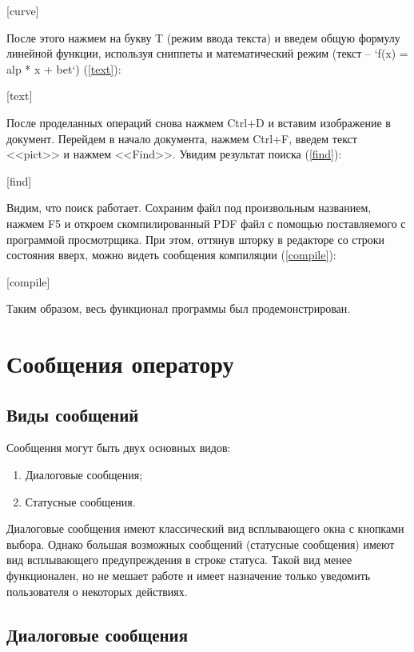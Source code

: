 \documentclass[opermanual]{espd}
\begin{document}
[curve]

После этого нажмем на букву T (режим ввода текста) и введем общую формулу линейной функции, используя сниппеты и математический режим (текст -- `f(x) = alp * x + bet`) (\ref{text}):

[text]

После проделанных операций снова нажмем Ctrl+D и вставим изображение в документ. Перейдем в начало документа, нажмем Ctrl+F, введем текст <<pict>> и нажмем <<Find>>. Увидим результат поиска (\ref{find}):

[find]

Видим, что поиск работает. Сохраним файл под произвольным названием, нажмем F5 и откроем скомпилированный PDF файл с помощью поставляемого с программой просмотрщика. При этом, оттянув шторку в редакторе со строки состояния вверх, можно видеть сообщения компиляции (\ref{compile}):

[compile]

Таким образом, весь функционал программы был продемонстрирован.

\section{Сообщения оператору}
\subsection{Виды сообщений}
Сообщения могут быть двух основных видов:
\begin{enumerate}
\item Диалоговые сообщения;
\item Статусные сообщения.
\end{enumerate}

Диалоговые сообщения имеют классический вид всплывающего окна с кнопками выбора. Однако большая возможных сообщений (статусные сообщения) имеют вид всплывающего предупреждения в строке статуса. Такой вид менее функционален, но не мешает работе и имеет назначение только уведомить пользователя о некоторых действиях.

\subsection{Диалоговые сообщения}
\end{document}
